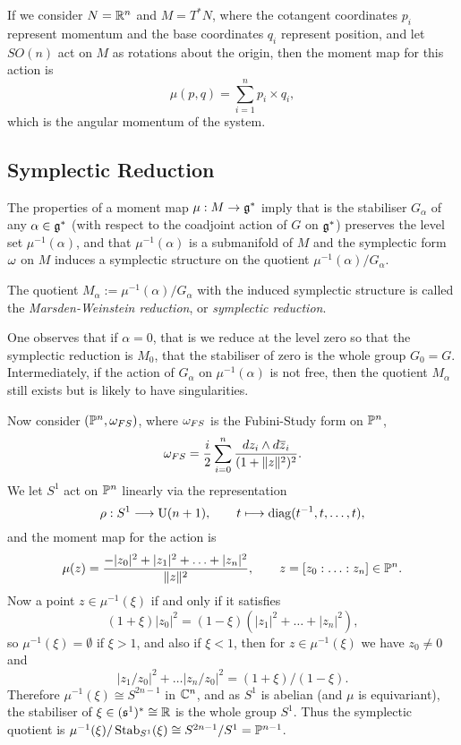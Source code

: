 \begin{rmk}
	If we consider $N = \mathbb{R}^{n}$ and $M = T^{\ast}N$, where the cotangent coordinates $p_{i}$ represent momentum and the base coordinates $q_{i}$ represent position, and let $SO(n)$ act on $M$ as rotations about the origin, then the moment map for this action is
	$$
		\mu(p,q) = \sum_{i=1}^{n} p_{i} \times q_{i},
	$$
	which is the angular momentum of the system.
\end{rmk}

\subsection{Symplectic Reduction}

The properties of a moment map $\mu : M \rightarrow \mathfrak{g}^{\ast}$ imply that is the stabiliser $G_{\alpha}$ of any $\alpha \in \mathfrak{g}^{\ast}$ (with respect to the coadjoint action of $G$ on $\mathfrak{g}^{\ast}$) preserves the level set $\mu^{-1}(\alpha)$, and that $\mu^{-1}(\alpha)$ is a submanifold of $M$ and the symplectic form $\omega$ on $M$ induces a symplectic structure on the quotient $\mu^{-1}(\alpha)/G_{\alpha}$.

\begin{defn}
	The quotient $M_{\alpha} := \mu^{-1}(\alpha)/G_{\alpha}$ with the induced symplectic structure is called the \emph{Marsden-Weinstein reduction}, or \emph{symplectic reduction}. 
\end{defn}

One observes that if $\alpha = 0$, that is we reduce at the level zero so that the symplectic reduction is $M_{0}$, that the stabiliser of zero is the whole group $G_{0} = G$. Intermediately, if the action of $G_{\alpha}$ on $\mu^{-1}(\alpha)$ is not free, then the quotient $M_{\alpha}$ still exists but is likely to have singularities.

\begin{ex}
	Now consider $(\mathbb{P}^{n}, \omega_{FS})$, where $\omega_{FS}$ is the Fubini-Study \K form on $\mathbb{P}^{n}$,
	$$
		\omega_{FS} = \frac{i}{2}\sum_{i=0}^{n}\frac{dz_{i} \wedge d\overline{z}_{i}}{(1 + \|z\|^{2})^{2}}.
	$$
	We let $S^{1}$ act on $\mathbb{P}^{n}$ linearly via the representation
	$$
	\rho: S^{1} \longrightarrow \operatorname{U}(n+1),\qquad t \longmapsto \operatorname{diag}(t^{-1},t,\ldots, t),
	$$
	and the moment map for the action is
	$$
	\mu(z) = \frac{-|z_{0}|^{2} + |z_{1}|^{2} + \ldots + |z_{n}|^{2}}{\|z\|^{2}},\qquad z = [z_{0}:\ldots: z_{n}] \in \mathbb{P}^{n}.
	$$
	Now a point $z \in \mu^{-1}(\xi)$ if and only if it satisfies
	$$
	(1+\xi)|z_{0}|^{2} = (1-\xi)( |z_{1}|^{2} + \ldots +  |z_{n}|^{2}),
	$$
	so $\mu^{-1}(\xi) = \emptyset$ if $\xi > 1$, and also if $\xi < 1$, then for $z \in \mu^{-1}(\xi)$ we have $z_{0} \neq 0$ and
	$$
	|z_{1}/z_{0}|^{2} + \ldots |z_{n}/z_{0}|^{2} = (1+\xi)/(1-\xi).
	$$
	Therefore $\mu^{-1}(\xi) \cong S^{2n-1}$ in $\mathbb{C}^{n}$, and as $S^{1}$ is abelian (and $\mu$ is equivariant), the stabiliser of $\xi \in (\mathfrak{s}^{1})^{\ast} \cong \mathbb{R}$ is the whole group $S^{1}$. Thus the symplectic quotient is $\mu^{-1}(\xi)/\operatorname{Stab}_{S^{1}}(\xi) \cong S^{2n-1}/S^{1} = \mathbb{P}^{n-1}$.
\end{ex}

